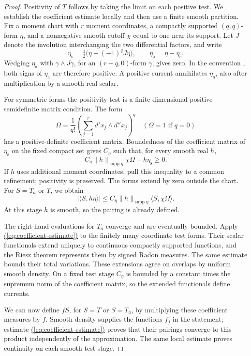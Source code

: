 \documentclass[11pt]{amsart}
\theoremstyle{definition}
\theoremstyle{remark}
\numberwithin{equation}{section}
\renewcommand{\eqref}[1]{%
 \begingroup\hypersetup{linkcolor=equationviolet}%
 \hyperref[#1]{\textup{(\ref*{#1})}}%
 \endgroup}
\DeclareMathOperator{\supp}{supp}
\begin{document}
\begin{proof}
Positivity of \(T\) follows by taking the limit on each positive test.
We establish the coefficient estimate locally and then use a finite
smooth partition. Fix a moment chart with \(r\) moment coordinates,
a compactly supported \((q,q)\)-form \(\eta\), and a nonnegative
smooth cutoff \(\chi\) equal to one near its support. Let \(J\) denote
the involution interchanging the two differential factors, and write
\[
 \eta_{\mathrm s}=\tfrac12\bigl(\eta+(-1)^qJ\eta\bigr),
 \qquad \eta_{\mathrm a}=\eta-\eta_{\mathrm s}.
\]
Wedging \(\eta_{\mathrm a}\) with \(\gamma\wedge J\gamma\), for an
\((r-q,0)\)-form \(\gamma\), gives zero. In the convention
\cite[Definition 5.1.1(c)]{CLD12}, both signs of
\(\eta_{\mathrm a}\) are therefore positive. A positive current
annihilates \(\eta_{\mathrm a}\), also after multiplication by a
smooth real scalar.

For symmetric forms the positivity test is a finite-dimensional
positive-semidefinite matrix condition. The form
\[
 \Omega=\frac1{q!}\left(\sum_{j=1}^r d'x_j\wedge d''x_j\right)^q
 \quad(\Omega=1\text{ if }q=0)
\]
has a positive-definite coefficient matrix. Boundedness of the
coefficient matrix of \(\eta_{\mathrm s}\) on the fixed compact set
gives \(C_\eta\) such that, for every smooth real \(h\),
\[
 C_\eta\|h\|_{\supp\eta}\chi\Omega\pm h\eta_{\mathrm s}\geq0.
\]
If \(h\) uses additional moment coordinates, pull this inequality
to a common refinement; positivity is preserved. The forms extend
by zero outside the chart. For \(S=T_a\) or \(T\), we obtain
\begin{equation}\label{eq:coefficient-estimate}
 |\langle S,h\eta\rangle|
 \leq C_\eta\|h\|_{\supp\eta}\langle S,\chi\Omega\rangle.
\end{equation}
At this stage \(h\) is smooth, so the pairing is already defined.

The right-hand evaluations for \(T_a\) converge and are eventually
bounded. Apply \eqref{eq:coefficient-estimate} to the finitely many
coordinate test forms. Their scalar functionals extend uniquely to
continuous compactly supported functions, and the Riesz theorem
represents them by signed Radon measures. The same estimate bounds
their total variations. These extensions agree on overlaps by
uniform smooth density. On a fixed test stage \(C_\eta\) is bounded
by a constant times the supremum norm of the coefficient matrix,
so the extended functionals define currents.

We can now define \(fS\), for \(S=T\) or \(S=T_a\), by multiplying
these coefficient measures by \(f\). Smooth density supplies
the functions \(f_j\) in the statement; estimate
\eqref{eq:coefficient-estimate} proves that their pairings converge
to this product independently of the approximation. The same local
estimate proves continuity on each smooth test stage.


\end{proof}
\end{document}
